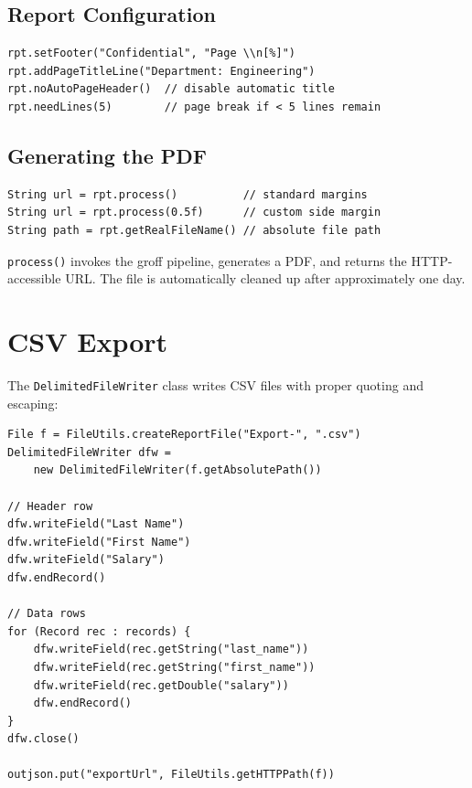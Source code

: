 \subsection{Report Configuration}

\begin{lstlisting}[style=groovy]
rpt.setFooter("Confidential", "Page \\n[%]")
rpt.addPageTitleLine("Department: Engineering")
rpt.noAutoPageHeader()  // disable automatic title
rpt.needLines(5)        // page break if < 5 lines remain
\end{lstlisting}

\subsection{Generating the PDF}

\begin{lstlisting}[style=groovy]
String url = rpt.process()          // standard margins
String url = rpt.process(0.5f)      // custom side margin
String path = rpt.getRealFileName() // absolute file path
\end{lstlisting}

\noindent
\texttt{process()} invokes the groff pipeline, generates a PDF, and returns the HTTP-accessible URL.  The file is automatically cleaned up after approximately one day.

\section{CSV Export}
\label{sec:rpt-csv}

The \texttt{DelimitedFileWriter} class writes CSV files with proper quoting and escaping:

\begin{lstlisting}[style=groovy]
File f = FileUtils.createReportFile("Export-", ".csv")
DelimitedFileWriter dfw =
    new DelimitedFileWriter(f.getAbsolutePath())

// Header row
dfw.writeField("Last Name")
dfw.writeField("First Name")
dfw.writeField("Salary")
dfw.endRecord()

// Data rows
for (Record rec : records) {
    dfw.writeField(rec.getString("last_name"))
    dfw.writeField(rec.getString("first_name"))
    dfw.writeField(rec.getDouble("salary"))
    dfw.endRecord()
}
dfw.close()

outjson.put("exportUrl", FileUtils.getHTTPPath(f))
\end{lstlisting}

